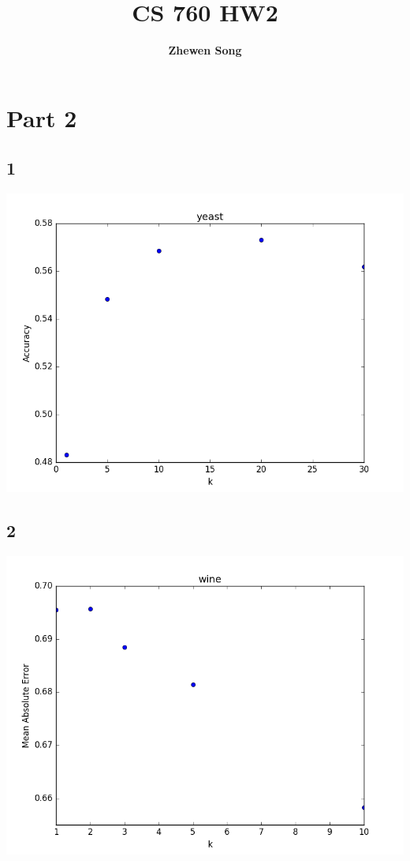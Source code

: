 \documentclass[12pt]{article}
\title{\textbf{CS 760 HW2}}
\author{\textbf{Zhewen Song}}
\begin{document}
\section*{Part 2}
\subsection*{1}
\begin{center}
	\includegraphics[scale=0.6]{yeast.png}
\end{center}
\subsection*{2}
\begin{center}
	\includegraphics[scale=0.6]{wine.png}
\end{center}
\end{document}
